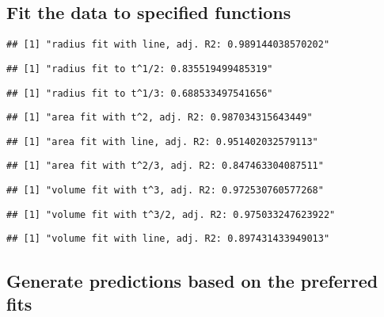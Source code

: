 \documentclass[]{article}
\begin{document}
\hypertarget{fit-the-data-to-specified-functions}{%
\subsection{Fit the data to specified
functions}\label{fit-the-data-to-specified-functions}}

\begin{verbatim}
## [1] "radius fit with line, adj. R2: 0.989144038570202"
\end{verbatim}

\begin{verbatim}
## [1] "radius fit to t^1/2: 0.835519499485319"
\end{verbatim}

\begin{verbatim}
## [1] "radius fit to t^1/3: 0.688533497541656"
\end{verbatim}

\begin{verbatim}
## [1] "area fit with t^2, adj. R2: 0.987034315643449"
\end{verbatim}

\begin{verbatim}
## [1] "area fit with line, adj. R2: 0.951402032579113"
\end{verbatim}

\begin{verbatim}
## [1] "area fit with t^2/3, adj. R2: 0.847463304087511"
\end{verbatim}

\begin{verbatim}
## [1] "volume fit with t^3, adj. R2: 0.972530760577268"
\end{verbatim}

\begin{verbatim}
## [1] "volume fit with t^3/2, adj. R2: 0.975033247623922"
\end{verbatim}

\begin{verbatim}
## [1] "volume fit with line, adj. R2: 0.897431433949013"
\end{verbatim}

\hypertarget{generate-predictions-based-on-the-preferred-fits}{%
\subsection{Generate predictions based on the preferred
fits}\label{generate-predictions-based-on-the-preferred-fits}}
\end{document}
